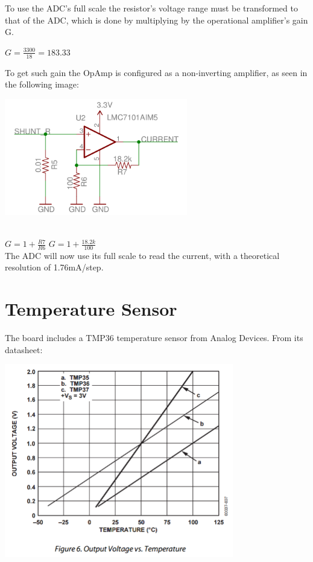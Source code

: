 \documentclass[11pt]{article}
\begin{document}
To use the ADC's full scale the resistor's voltage range must be transformed to that of the ADC, which is done by multiplying by the operational amplifier's gain G.

\center $G=\frac{3300}{18}=183.33$

\flushleft To get such gain the OpAmp is configured as a non-inverting amplifier, as seen in the following image:

\vspace{0.5cm}
\begin{minipage}[]{\linewidth}%
\center \includegraphics[width=8cm]{OpAmp.png}
\end{minipage}
\\[0.5cm]

\center $G=1+\frac{R7}{R6}$
\center $G=1+\frac{18.2k}{100}$
\\[0.4cm]

The ADC will now use its full scale to read the current, with a theoretical resolution of 1.76mA/step.

\newpage \thispagestyle{empty}
\bigskip \flushleft


\section*{Temperature Sensor}
The board includes a TMP36 temperature sensor from Analog Devices. From its datasheet:

\vspace{0.5cm}
\begin{minipage}[]{\linewidth}%
\center \includegraphics[width=10cm]{tmp36.png}
\end{minipage}
\\[0.5cm]
\end{document}
